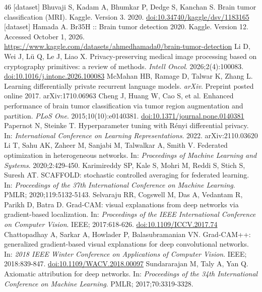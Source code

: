 \begin{thebibliography}{46}
 [dataset] Bhuvaji S, Kadam A, Bhumkar P, Dedge S, Kanchan S. Brain tumor classification (MRI). Kaggle. Version 3. 2020. \href{https://doi.org/10.34740/kaggle/dsv/1183165}{doi:10.34740/kaggle/dsv/1183165}
 [dataset] Hamada A. Br35H :: Brain tumor detection 2020. Kaggle. Version 12. Accessed October 1, 2026. \url{https://www.kaggle.com/datasets/ahmedhamada0/brain-tumor-detection}
 Li D, Wei J, L\"{u} Q, Le J, Liao X. Privacy-preserving medical image processing based on cryptography primitives: a review of methods. \textit{Intell Oncol}. 2026;2(4):100083. \href{https://doi.org/10.1016/j.intonc.2026.100083}{doi:10.1016/j.intonc.2026.100083}
 McMahan HB, Ramage D, Talwar K, Zhang L. Learning differentially private recurrent language models. \textit{arXiv}. Preprint posted online 2017. arXiv:1710.06963
 Cheng J, Huang W, Cao S, et al. Enhanced performance of brain tumor classification via tumor region augmentation and partition. \textit{PLoS One}. 2015;10(10):e0140381. \href{https://doi.org/10.1371/journal.pone.0140381}{doi:10.1371/journal.pone.0140381}
 Papernot N, Steinke T. Hyperparameter tuning with R\'enyi differential privacy. In: \textit{International Conference on Learning Representations}. 2022. arXiv:2110.03620
 Li T, Sahu AK, Zaheer M, Sanjabi M, Talwalkar A, Smith V. Federated optimization in heterogeneous networks. In: \textit{Proceedings of Machine Learning and Systems}. 2020;2:429-450.
 Karimireddy SP, Kale S, Mohri M, Reddi S, Stich S, Suresh AT. SCAFFOLD: stochastic controlled averaging for federated learning. In: \textit{Proceedings of the 37th International Conference on Machine Learning}. PMLR; 2020;119:5132-5143.
 Selvaraju RR, Cogswell M, Das A, Vedantam R, Parikh D, Batra D. Grad-CAM: visual explanations from deep networks via gradient-based localization. In: \textit{Proceedings of the IEEE International Conference on Computer Vision}. IEEE; 2017:618-626. \href{https://doi.org/10.1109/ICCV.2017.74}{doi:10.1109/ICCV.2017.74}
 Chattopadhay A, Sarkar A, Howlader P, Balasubramanian VN. Grad-CAM++: generalized gradient-based visual explanations for deep convolutional networks. In: \textit{2018 IEEE Winter Conference on Applications of Computer Vision}. IEEE; 2018:839-847. \href{https://doi.org/10.1109/WACV.2018.00097}{doi:10.1109/WACV.2018.00097}
 Sundararajan M, Taly A, Yan Q. Axiomatic attribution for deep networks. In: \textit{Proceedings of the 34th International Conference on Machine Learning}. PMLR; 2017;70:3319-3328.

\end{thebibliography}
